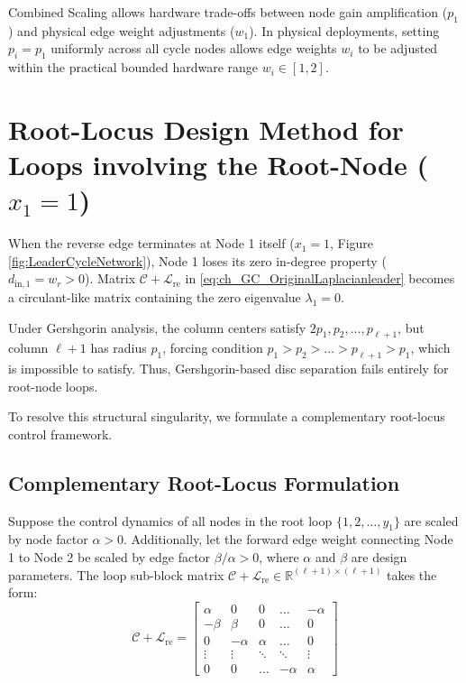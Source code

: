 \begin{remark}\label{rem:ch_GC_combined_flexibility}
Combined Scaling allows hardware trade-offs between node gain amplification ($p_1$) and physical edge weight adjustments ($w_1$). In physical deployments, setting $p_i = p_1$ uniformly across all cycle nodes allows edge weights $w_i$ to be adjusted within the practical bounded hardware range $w_i \in [1, 2]$.
\end{remark}


\section{Root-Locus Design Method for Loops involving the Root-Node ($x_1 = 1$)}\label{sec:ch_GC_RootLocusMethod}

When the reverse edge terminates at Node 1 itself ($x_1 = 1$, Figure \ref{fig:LeaderCycleNetwork}), Node 1 loses its zero in-degree property ($d_{\text{in}, 1} = w_r > 0$). Matrix $\mathcal{C} + \mathcal{L}_{\text{re}}$ in \eqref{eq:ch_GC_OriginalLaplacianleader} becomes a circulant-like matrix containing the zero eigenvalue $\lambda_1 = 0$. 

Under Gershgorin analysis, the column centers satisfy $2p_1, p_2, \dots, p_{\ell+1}$, but column $\ell+1$ has radius $p_1$, forcing condition $p_1 > p_2 > \dots > p_{\ell+1} > p_1$, which is impossible to satisfy. Thus, Gershgorin-based disc separation fails entirely for root-node loops.

To resolve this structural singularity, we formulate a complementary root-locus control framework.

\subsection{Complementary Root-Locus Formulation}

Suppose the control dynamics of all nodes in the root loop $\{1, 2, \dots, y_1\}$ are scaled by node factor $\alpha > 0$. Additionally, let the forward edge weight connecting Node 1 to Node 2 be scaled by edge factor $\beta / \alpha > 0$, where $\alpha$ and $\beta$ are design parameters. The loop sub-block matrix $\mathcal{C} + \mathcal{L}_{\text{re}} \in \mathbb{R}^{(\ell+1) \times (\ell+1)}$ takes the form:
\begin{equation}\label{eq:ch_GC_scaledmatrix}
	\mathcal{C} + \mathcal{L}_{\text{re}} = \begin{bmatrix}
		\alpha  & 0 & 0 & \dots & -\alpha \\
		-\beta & \beta & 0 & \dots & 0 \\
		0 & -\alpha & \alpha & \dots & 0 \\
		\vdots & \vdots & \ddots & \ddots & \vdots \\
		0 & 0 & \dots & -\alpha & \alpha
	\end{bmatrix}
\end{equation}

